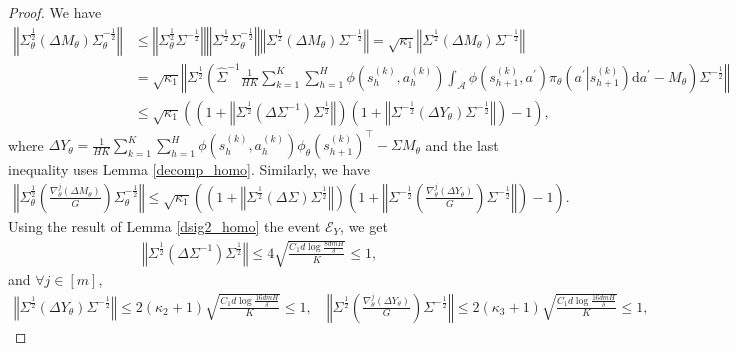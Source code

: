 \documentclass{article}
\numberwithin{equation}{section}
\begin{document}
\begin{proof}
We have
\begin{align*}
    \left\Vert\Sigma_\theta^{\frac{1}{2}}\left(\Delta M_\theta\right)\Sigma_\theta^{-\frac{1}{2}}\right\Vert&\leq\left\Vert\Sigma_\theta^{\frac{1}{2}}\Sigma^{-\frac{1}{2}}\right\Vert\left\Vert\Sigma^{\frac{1}{2}}\Sigma_\theta^{-\frac{1}{2}}\right\Vert\left\Vert\Sigma^{\frac{1}{2}}\left(\Delta M_\theta\right)\Sigma^{-\frac{1}{2}}\right\Vert=\sqrt{\kappa_1}\left\Vert\Sigma^{\frac{1}{2}}\left(\Delta M_\theta\right)\Sigma^{-\frac{1}{2}}\right\Vert\\
    &=\sqrt{\kappa_1}\left\Vert\Sigma^{\frac{1}{2}}\left(\widehat{\Sigma}^{-1}\frac{1}{HK}\sum_{k=1}^K\sum_{h=1}^H\phi\left(s_h^{(k)},a_h^{(k)}\right)\int_{\mathcal{A}}\phi\left(s_{h+1}^{(k)},a^\prime\right)\pi_\theta\left(a^\prime\left\vert s_{h+1}^{(k)}\right.\right)\mathrm{d}a^\prime- M_\theta\right)\Sigma^{-\frac{1}{2}}\right\Vert\\
    &\leq\sqrt{\kappa_1}\left(\left(1+\left\Vert\Sigma^{\frac{1}{2}}\left(\Delta\Sigma^{-1}\right)\Sigma^{\frac{1}{2}}\right\Vert\right)\left(1+\left\Vert\Sigma^{-\frac{1}{2}}\left(\Delta Y_\theta\right)\Sigma^{-\frac{1}{2}}\right\Vert\right)-1\right),
\end{align*}
where $\Delta Y_\theta=\frac{1}{HK}\sum_{k=1}^K\sum_{h=1}^H\phi\left(s_h^{(k)},a_h^{(k)}\right)\phi_\theta\left(s_{h+1}^{(k)}\right)^\top-\Sigma M_\theta$ and the last inequality uses Lemma \ref{decomp_homo}. Similarly, we have
\begin{align*}
    \left\Vert\Sigma_\theta^{\frac{1}{2}}\left(\frac{\nabla_\theta^j\left(\Delta M_\theta\right)}{G}\right)\Sigma_\theta^{-\frac{1}{2}}\right\Vert\leq\sqrt{\kappa_1}\left(\left(1+\left\Vert\Sigma^{\frac{1}{2}}\left(\Delta\Sigma\right)\Sigma^{\frac{1}{2}}\right\Vert\right)\left(1+\left\Vert\Sigma^{-\frac{1}{2}}\left(\frac{\nabla_\theta^j\left(\Delta Y_\theta\right)}{G}\right)\Sigma^{-\frac{1}{2}}\right\Vert\right)-1\right).
\end{align*}
Using the result of Lemma \ref{dsig2_homo} the event $\mathcal{E}_Y$, we get 
\begin{align*}
    \left\Vert\Sigma^{\frac{1}{2}}\left(\Delta\Sigma^{-1}\right)\Sigma^{\frac{1}{2}}\right\Vert\leq 4\sqrt{\frac{C_1d\log\frac{8dmH}{\delta}}{K}}\leq 1, 
\end{align*}
and $\forall j\in[m]$, 
\begin{align*}
    \left\Vert\Sigma^{\frac{1}{2}}\left(\Delta Y_\theta\right)\Sigma^{-\frac{1}{2}}\right\Vert\leq 2(\kappa_2+1)\sqrt{\frac{C_1d\log\frac{16dmH}{\delta}}{K}}\leq 1,\quad\left\Vert\Sigma^{\frac{1}{2}}\left(\frac{\nabla_\theta^j\left(\Delta Y_\theta\right)}{G}\right)\Sigma^{-\frac{1}{2}}\right\Vert\leq 2(\kappa_3+1)\sqrt{\frac{C_1d\log\frac{16dmH}{\delta}}{K}}\leq 1,

\end{align*}
\end{proof}
\end{document}
